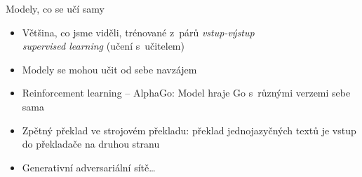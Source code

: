 \documentclass[handout,aspectratio=169,dvipsnames]{beamer}
\begin{document}
\begin{frame}{Modely, co se učí samy}

    \begin{itemize}[<+->]

        \item Většina, co jsme viděli, trénované z~párů \emph{vstup-výstup}
            \\ \quad\emph{supervised learning} (učení s~učitelem)

        \item Modely se mohou učit od sebe navzájem

        \item Reinforcement learning -- AlphaGo: Model hraje Go s~různými
            verzemi sebe sama \\ {\tiny \citep{singh2017learning}}

        \item Zpětný překlad ve strojovém překladu: překlad jednojazyčných
            textů je vstup do překladače na druhou stranu {\tiny \citep{sennrich2016improving}}

        \item Generativní adversariální sítě\ldots

    \end{itemize}

\end{frame}

\end{document}
